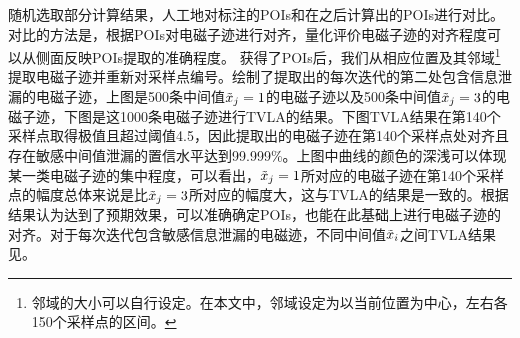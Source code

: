 {{{	%
}

	随机选取部分计算结果，人工地对标注的POIs和在\yuchuli 之后计算出的POIs进行对比。对比的方法是，根据POIs对电磁子迹进行对齐，量化评价电磁子迹的对齐程度可以从侧面反映POIs提取的准确程度。
	获得了POIs后，我们从相应位置及其邻域\footnote{邻域的大小可以自行设定。在本文中，邻域设定为以当前位置为中心，左右各150个采样点的区间。}提取电磁子迹并重新对采样点编号。绘制了提取出的每次迭代的第二处包含信息泄漏的电磁子迹，上图是500条中间值$\tilde{x}_j=1$的电磁子迹以及500条中间值$\tilde{x}_j=3$的电磁子迹，下图是这1000条电磁子迹进行TVLA的结果。下图TVLA结果在第140个采样点取得极值且超过阈值4.5，因此提取出的电磁子迹在第140个采样点处对齐且存在敏感中间值泄漏的置信水平达到99.999\%。上图中曲线的颜色的深浅可以体现某一类电磁子迹的集中程度，可以看出，$\tilde{x}_j=1$所对应的电磁子迹在第140个采样点的幅度总体来说是比$\tilde{x}_j=3$所对应的幅度大，这与TVLA的结果是一致的。根据结果认为\yuchuli 达到了预期效果，可以准确确定POIs，也能在此基础上进行电磁子迹的对齐。对于每次迭代包含敏感信息泄漏的电磁迹，不同中间值$\tilde{x}_i$之间TVLA结果见。
	
}}
